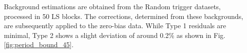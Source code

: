 \newpage
Background estimations are obtained from the Random trigger datasets, processed in 50 LS blocks. The corrections, determined from these backgrounds, are subsequently applied to the zero-bias data. %
While Type 1 residuals are minimal, Type 2 shows a slight deviation of around 0.2\% as shown in Fig. \ref{fig:period_bound_45}.

